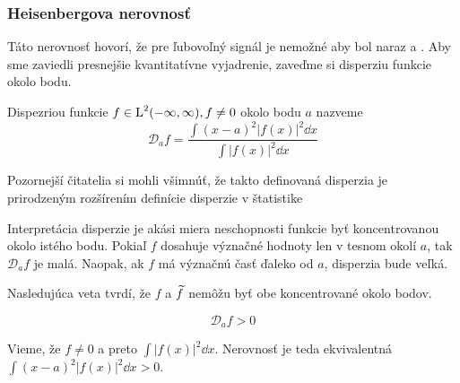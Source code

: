 \subsubsection{Heisenbergova nerovnosť}

Táto nerovnosť hovorí, že pre ľubovoľný signál je nemožné aby bol
naraz  a .
Aby sme zaviedli presnejšie kvantitatívne vyjadrenie, zaveďme si
disperziu funkcie okolo bodu.

\def\disperzia#1{\mathcal{D}_{#1}}
\begin{definicia}
    Dispezriou funkcie $f \in \mbox{L}^2(-\infty,\infty), f \not = 0$ okolo bodu $a$ nazveme
    \begin{equation}
        \disperzia{a} f = \frac{\int (x-a)^2 |f(x)|^2 \dd x}
                               {\int |f(x)|^2 \dd x}
    \end{equation}
\end{definicia}
\begin{poznamka}
    Pozornejší čitatelia si mohli všimnúť, že takto definovaná
    disperzia je prirodzeným rozšírením definície disperzie v
    štatistike
\end{poznamka}
Interpretácia disperzie je akási miera neschopnosti funkcie byť
koncentrovanou okolo istého bodu. Pokiaľ $f$ dosahuje význačné hodnoty
len v tesnom okolí $a$, tak $\disperzia{a}f$ je malá. Naopak, ak
$f$ má význačnú časť ďaleko od $a$, disperzia bude veľká.

Nasledujúca veta tvrdí, že $f$ a $\widetilde{f}$ nemôžu byť obe
koncentrované okolo bodov.

\begin{lema}
    \begin{equation}
        \disperzia{a}f > 0
    \end{equation}
\end{lema}
\begin{dokaz}
    Vieme, že $f\not=0$ a preto $\int |f(x)|^2 \dd x$.
    Nerovnosť je teda ekvivalentná
    $\int (x-a)^2 |f(x)|^2 \dd x > 0$.
    
\end{dokaz}

